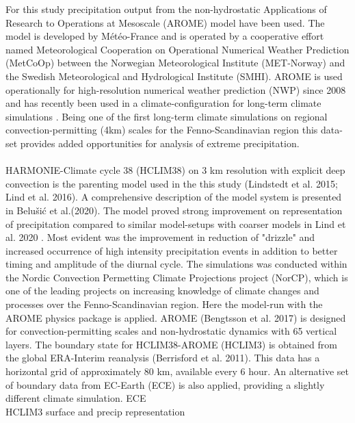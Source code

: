 For this study precipitation output from the non-hydrostatic Applications of Research to Operations at Mesoscale (AROME)\cite{seity_arome} model have been used. The model is developed by Météo-France and is operated by a cooperative effort named Meteorological Cooperation on Operational Numerical Weather Prediction (MetCoOp) between the Norwegian Meteorological Institute (MET-Norway) and the Swedish Meteorological and Hydrological Institute (SMHI). AROME is used operationally for high-resolution numerical weather prediction (NWP) since 2008 and has recently been used in a climate-configuration for long-term climate simulations \cite{lind_arome]}. Being one of the first long-term climate simulations on regional convection-permitting (\<4km) scales for the Fenno-Scandinavian region this data-set provides added opportunities for analysis of extreme precipitation.  
\\
\\
HARMONIE-Climate cycle 38 (HCLIM38) on 3 km resolution with explicit deep convection is the parenting model used in the this study (Lindstedt et al. 2015\cite{lindstedt_hclim}; Lind et al. 2016\cite{lind_hclim}). A comprehensive description of the model system is presented in Belušić et al.(2020)\cite{belusic_hclim}. The model proved strong improvement on representation of precipitation compared to similar model-setups with coarser models in Lind et al. 2020 \cite{lind_arome}. Most evident was the improvement in reduction of "drizzle" and increased occurrence of high intensity precipitation events in addition to better timing and amplitude of the diurnal cycle. The simulations was conducted within the Nordic Convection Permetting Climate Projections project (NorCP), which is one of the leading projects on increasing knowledge of climate changes and processes over the Fenno-Scandinavian region. Here the model-run with the AROME physics package is applied. AROME (Bengtsson et al. 2017)\cite{bengtsson_arome} is designed for convection-permitting scales and non-hydrostatic dynamics with 65 vertical layers. The boundary state for HCLIM38-AROME (HCLIM3) is obtained from the global ERA-Interim reanalysis (Berrisford et al. 2011)\cite{erai}. This data has a horizontal grid of approximately 80 km, available every 6 hour. An alternative set of boundary data from EC-Earth (ECE) is also applied, providing a slightly different climate simulation.    
ECE
\\
HCLIM3
surface and precip representation

